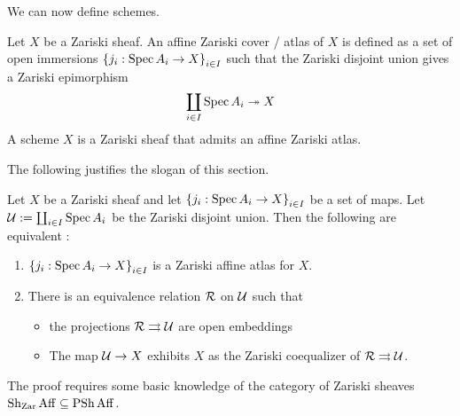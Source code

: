 \documentclass[./main.tex]{subfiles}
\begin{document}
We can now define schemes.
\begin{dfn}

  Let $X$ be a Zariski sheaf.
  An affine Zariski cover / atlas of $X$ is defined as
  a set of open immersions $\left\{j_i : \operatorname{Spec} A_i \to X\right\}_{i \in I}$
  such that the Zariski disjoint union gives a Zariski epimorphism
  \[
    \coprod_{i \in I} \operatorname{Spec} A_i \twoheadrightarrow X
  \]
  A scheme $X$ is a Zariski sheaf that admits
  an affine Zariski atlas.
\end{dfn}

The following justifies the slogan of this section.

\begin{prop}[Scheme = quotient of affines along open immersions]
  
  Let $X$ be a Zariski sheaf and let $\left\{j_i : \operatorname{Spec} A_i \to X\right\}_{i \in I}$
  be a set of maps.
  Let $\mathcal{U} := \coprod_{i \in I} \operatorname{Spec} A_i$ be the Zariski disjoint union.
  Then the following are equivalent : 
  \begin{enumerate}
    \item $\left\{j_i : \operatorname{Spec} A_i \to X\right\}_{i \in I}$ is a Zariski affine atlas
    for $X$.
    \item There is an equivalence relation $\mathcal{R}$ on $\mathcal{U}$ such that
    \begin{itemize}
      \item the projections $\mathcal{R} \rightrightarrows \mathcal{U}$ are open embeddings
      \item The map $\mathcal{U} \to X$ exhibits $X$ as 
      the Zariski coequalizer of $\mathcal{R} \rightrightarrows \mathcal{U}$.
    \end{itemize}
  \end{enumerate}
\end{prop}

The proof requires some basic knowledge of the category of
Zariski sheaves $\operatorname{Sh}_{\mathrm{Zar}} \mathrm{Aff} \subseteq \operatorname{PSh} \mathrm{Aff}$.
\end{document}
